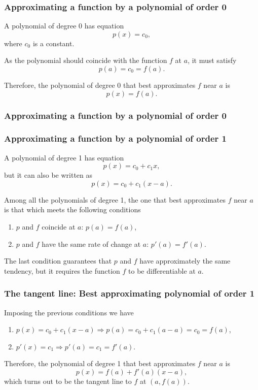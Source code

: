 \begin{frame}
\frametitle{Approximating a function by a polynomial of order 0}
A polynomial of degree 0 has equation
\[
p(x) = c_0,
\]
where $c_0$ is a constant.

As the polynomial should coincide with the function $f$ at $a$, it must satisfy
\[p(a) = c_0 = f(a).\]

Therefore, the polynomial of degree 0 that best approximates $f$ near $a$ is
\[p(x) = f(a).\]
\end{frame}


\begin{frame}
\frametitle{Approximating a function by a polynomial of order 0}
\begin{center}

\end{center}
\end{frame}


\begin{frame}
\frametitle{Approximating a function by a polynomial of order 1}
A polynomial of degree 1 has equation
\[
p(x) = c_0+c_1x,
\]
but it can also be written as 
\[
p(x) = c_0+c_1(x-a).
\]

Among all the polynomials of degree 1, the one that best approximates $f$ near $a$ is that which meets the following conditions

\begin{enumerate}
\item $p$ and $f$ coincide at $a$: $p(a) = f(a)$,
\item $p$ and $f$ have the same rate of change at $a$: $p'(a) = f'(a)$.
\end{enumerate}

The last condition guarantees that $p$ and $f$ have approximately the same tendency, but it requires the function $f$ to be differentiable at $a$.
\end{frame}


\begin{frame}
\frametitle{The tangent line: Best approximating polynomial of order 1}
Imposing the previous conditions we have
\begin{enumerate}
\item $p(x)=c_0+c_1(x-a) \Rightarrow p(a)=c_0+c_1(a-a)=c_0=f(a)$,
\item $p'(x)=c_1 \Rightarrow p'(a)=c_1=f'(a)$.
\end{enumerate}

Therefore, the polynomial of degree 1 that best approximates $f$ near $a$ is
\[
p(x) = f(a)+f '(a)(x-a),
\]
which turns out to be the tangent line to $f$ at $(a,f(a))$.
\end{frame}


